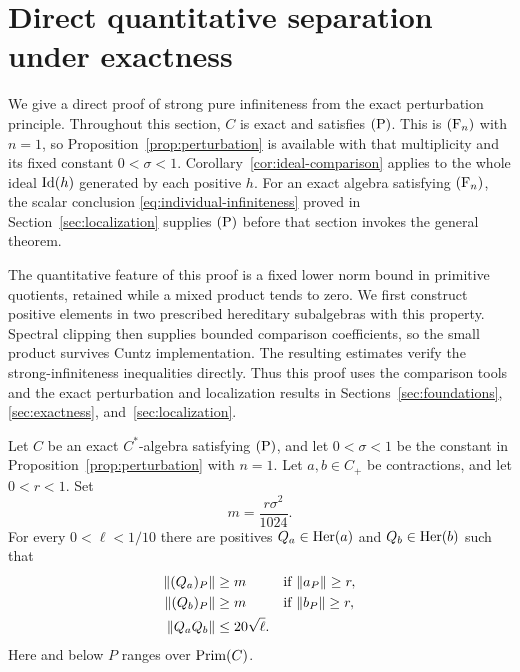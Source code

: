 \section{Direct quantitative separation under exactness}\label{sec:quantitative}

We give a direct proof of strong pure infiniteness from the exact
perturbation principle.  Throughout this section, $C$ is exact and
satisfies $\textup{(P)}$.  This is $\textup{(F\ensuremath{_n})}$ with $n=1$, so
Proposition~\ref{prop:perturbation} is available with that multiplicity
and its fixed constant $0<\sigma<1$.  Corollary~\ref{cor:ideal-comparison}
applies to the whole ideal $\operatorname{Id}(h)$ generated by each positive $h$.
For an exact algebra satisfying $\textup{(F\ensuremath{_n})}$, the scalar conclusion
\eqref{eq:individual-infiniteness} proved in Section~\ref{sec:localization}
supplies $\textup{(P)}$ before that section invokes the general theorem.

The quantitative feature of this proof is a fixed lower norm bound in
primitive quotients, retained while a mixed product tends to zero.
We first construct positive elements in two prescribed hereditary
subalgebras with this property.  Spectral clipping then supplies bounded
comparison coefficients, so the small product survives Cuntz
implementation.  The resulting estimates verify the strong-infiniteness
inequalities directly.  Thus this proof uses the comparison tools and
the exact perturbation and localization results in
Sections~\ref{sec:foundations}, \ref{sec:exactness}, and~\ref{sec:localization}.

\begin{lemma}
\label{lem:separating-positives}
Let $C$ be an exact $C^*$-algebra satisfying $\textup{(P)}$, and let
$0<\sigma<1$ be the constant in Proposition~\ref{prop:perturbation}
with $n=1$.  Let $a,b\in C_+$ be contractions, and let $0<r<1$.  Set
\[
 m=\frac{r\sigma^2}{1024}.
\]
For every $0<\ell<1/10$ there are positives
$Q_a\in\operatorname{Her}(a)$ and $Q_b\in\operatorname{Her}(b)$ such that
\begin{align}
 \|(Q_a)_P\|&\ge m &&\text{if }\|a_P\|\ge r,\notag\\
 \|(Q_b)_P\|&\ge m &&\text{if }\|b_P\|\ge r,
 \label{eq:separation-quotient-bounds}\\
 \|Q_aQ_b\|&\le20\sqrt\ell.
 \label{eq:separation-product-bound}
\end{align}
Here and below $P$ ranges over $\operatorname{Prim}(C)$.
\end{lemma}

